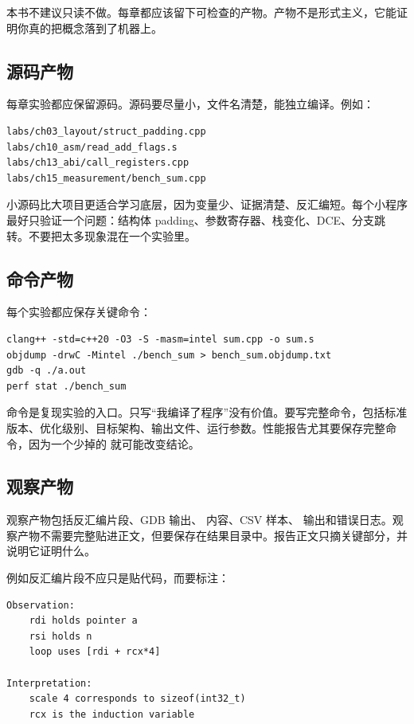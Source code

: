 本书不建议只读不做。每章都应该留下可检查的产物。产物不是形式主义，它能证明你真的把概念落到了机器上。

\subsection{源码产物}

每章实验都应保留源码。源码要尽量小，文件名清楚，能独立编译。例如：

\begin{lstlisting}
labs/ch03_layout/struct_padding.cpp
labs/ch10_asm/read_add_flags.s
labs/ch13_abi/call_registers.cpp
labs/ch15_measurement/bench_sum.cpp
\end{lstlisting}

小源码比大项目更适合学习底层，因为变量少、证据清楚、反汇编短。每个小程序最好只验证一个问题：结构体 padding、参数寄存器、栈变化、DCE、分支跳转。不要把太多现象混在一个实验里。

\subsection{命令产物}

每个实验都应保存关键命令：

\begin{lstlisting}
clang++ -std=c++20 -O3 -S -masm=intel sum.cpp -o sum.s
objdump -drwC -Mintel ./bench_sum > bench_sum.objdump.txt
gdb -q ./a.out
perf stat ./bench_sum
\end{lstlisting}

命令是复现实验的入口。只写“我编译了程序”没有价值。要写完整命令，包括标准版本、优化级别、目标架构、输出文件、运行参数。性能报告尤其要保存完整命令，因为一个少掉的  就可能改变结论。

\subsection{观察产物}

观察产物包括反汇编片段、GDB 输出、 内容、CSV 样本、 输出和错误日志。观察产物不需要完整贴进正文，但要保存在结果目录中。报告正文只摘关键部分，并说明它证明什么。

例如反汇编片段不应只是贴代码，而要标注：

\begin{lstlisting}
Observation:
    rdi holds pointer a
    rsi holds n
    loop uses [rdi + rcx*4]

Interpretation:
    scale 4 corresponds to sizeof(int32_t)
    rcx is the induction variable
\end{lstlisting}

